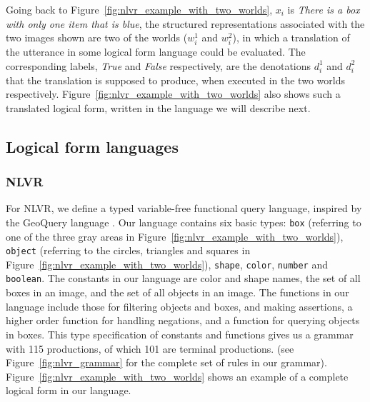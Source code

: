 Going back to Figure~\ref{fig:nlvr_example_with_two_worlds},
$x_i$ is \textit{There is a box with only one item that is blue}, the structured
representations associated with the two images shown are two of the worlds
($w^1_i$ and $w^2_i$), in which a translation of the utterance in some logical form
language could be evaluated. The corresponding labels, \textit{True} and
\textit{False} respectively, are the denotations $d^1_i$ and $d^2_i$ that 
the translation is supposed to produce, when executed in the two worlds
respectively. Figure~\ref{fig:nlvr_example_with_two_worlds} also shows such a
translated logical form, written in the language we will describe next.

\subsection{Logical form languages} \label{sec:logical_form_languages}
\subsubsection{NLVR}
For NLVR, we define a typed variable-free functional query language, inspired by the
GeoQuery language \citep{zelle1996learning}. Our language contains six basic
types: \texttt{box} (referring to one of the three gray areas in
Figure~\ref{fig:nlvr_example_with_two_worlds}), \texttt{object} (referring to the circles,
triangles and squares in Figure~\ref{fig:nlvr_example_with_two_worlds}), \texttt{shape},
\texttt{color}, \texttt{number} and \texttt{boolean}. The constants in our
language are color and shape names, the set of all boxes in an image, and the
set of all objects in an image. The functions in our language include those for
filtering objects and boxes, and making assertions, a higher order function for
handling negations, and a function for querying objects in boxes. This type
specification of constants and functions gives us a grammar with 115
productions, of which 101 are terminal productions.
(see Figure~\ref{fig:nlvr_grammar}
for the complete set of rules in our grammar).
Figure~\ref{fig:nlvr_example_with_two_worlds} shows an example of a complete logical form in our language.

